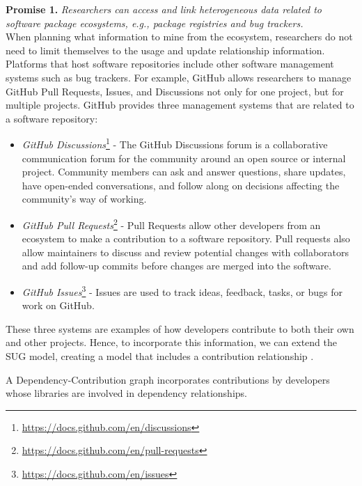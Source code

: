 \textbf{Promise 1.}\textit{
Researchers can access and link heterogeneous data related to software package ecosystems, e.g., package registries and bug trackers.}\\

When planning what information to mine from the ecosystem, researchers do not need to limit themselves to the usage and update relationship information.
Platforms that host software repositories include other software management systems such as bug trackers.
For example, GitHub allows researchers to manage GitHub Pull Requests, Issues, and Discussions not only for one project, but for multiple projects.
GitHub provides three management systems that are related to a software repository:

\begin{itemize}
    \item \textit{GitHub Discussions}\footnote{\url{https://docs.github.com/en/discussions}} - The GitHub Discussions forum is a collaborative communication forum for the community around an open source or internal project. Community members can ask and answer questions, share updates, have open-ended conversations, and follow along on decisions affecting the community's way of working.
    \item \textit{GitHub Pull Requests}\footnote{\url{https://docs.github.com/en/pull-requests}} - Pull Requests allow other developers from an ecosystem to make a contribution to a software repository. Pull requests also allow maintainers to discuss and review potential changes with collaborators and add follow-up commits before changes are merged into the software.
    \item \textit{GitHub Issues}\footnote{\url{https://docs.github.com/en/issues}} - Issues are used to track ideas, feedback, tasks, or bugs for work on GitHub.
\end{itemize}

These three systems are examples of how developers contribute to both their own and other projects. 
Hence, to incorporate this information, we can extend the SUG model, creating a model that includes a contribution relationship \cite{wattanakriengkrai2022giving}.


\begin{definition}
	A Dependency-Contribution graph incorporates contributions by developers whose libraries are involved in dependency relationships. 
\end{definition}


